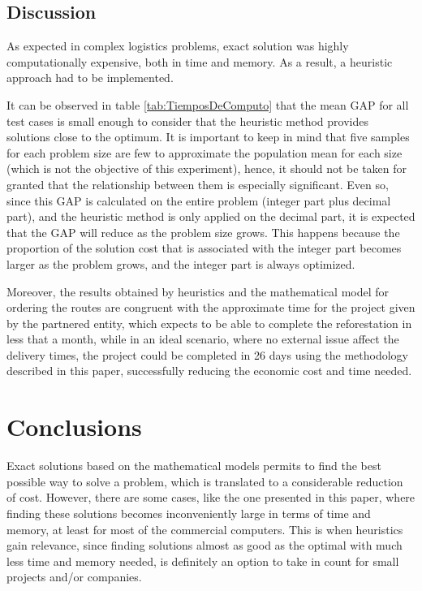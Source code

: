 \documentclass{amsart}
\begin{document}
            \subsection{Discussion}
    
    As expected in complex logistics problems, exact solution was highly computationally expensive, both in time and memory. As a result, a heuristic approach had to be implemented.
    
    It can be observed in table \ref{tab:TiemposDeComputo} that the mean GAP for all test cases is small enough to consider that the heuristic method provides solutions close to the optimum. It is important to keep in mind that five samples for each problem size are few to approximate the population mean for each size (which is not the objective of this experiment), hence, it should not be taken for granted that the relationship between them is especially significant. Even so, since this GAP is calculated on the entire problem (integer part plus decimal part), and the heuristic method is only applied on the decimal part, it is expected that the GAP will reduce as the problem size grows. This happens because the proportion of the solution cost that is associated with the integer part becomes larger as the problem grows, and the integer part is always optimized.
    
    Moreover, the results obtained by heuristics and the mathematical model for ordering the routes are congruent with the approximate time for the project given by the partnered entity, which expects to be able to complete the reforestation in less that a month, while in an ideal scenario, where no external issue affect the delivery times, the project could be completed in 26 days using the methodology described in this paper, successfully reducing the economic cost and time needed.


    
    \section{Conclusions}
    Exact solutions based on the mathematical models permits to find the best possible way to solve a problem, which is translated to a considerable reduction of cost. However, there are some cases, like the one presented in this paper, where finding these solutions becomes inconveniently large in terms of time and memory, at least for most of the commercial computers. This is when heuristics gain relevance, since finding solutions almost as good as the optimal with much less time and memory needed, is definitely an option to take in count for small projects and/or companies.
\end{document}
